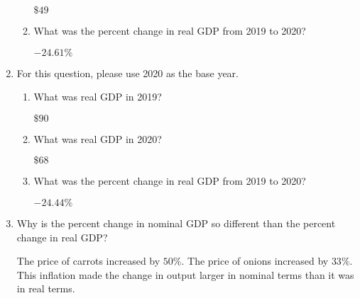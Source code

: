 \documentclass[
    letterpaper,paper=portrait,fleqn,
    DIV=16,fontsize=12pt,twoside=semi,
    parskip=full-,
    headings=standardclasses]
{scrartcl}
\begin{document}
\begin{enumerate}
\begin{enumerate}
\begin{solution}
$\$49$
\end{solution}

\vspace{-6pt}
\item What was the percent change in real GDP from 2019 to 2020?

\begin{solution}
$-24.61\%$
\end{solution}

\end{enumerate}

\vspace{-6pt}
\item For this question, please use 2020 as the base year.

\begin{enumerate}

\vspace{-6pt}
\item What was real GDP in 2019?

\begin{solution}
$\$90$
\end{solution}

\vspace{-6pt}
\item What was real GDP in 2020?

\begin{solution}
$\$68$
\end{solution}

\vspace{-6pt}
\item What was the percent change in real GDP from 2019 to 2020?

\begin{solution}
$-24.44\%$
\end{solution}

\end{enumerate}

\vspace{-6pt}
\item Why is the percent change in nominal GDP so different than the percent change in real GDP?

\begin{solution}
The price of carrots increased by $50\%$. The price of onions increased by $33\%$. This inflation made the change in output larger in nominal terms than it was in real terms.
\end{solution}

\end{enumerate}
\end{document}
